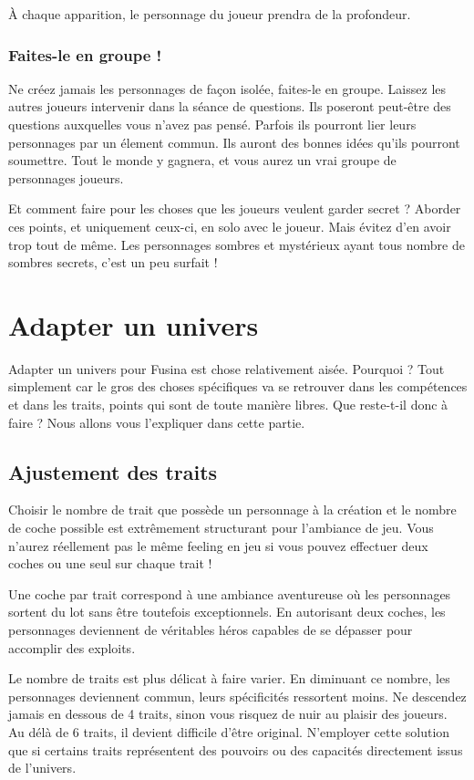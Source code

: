 \documentclass{conf/FusinaClass}
\begin{document}
À chaque apparition, le personnage du joueur prendra de la profondeur.

\section{Faites-le en groupe !}
Ne créez jamais les personnages de façon isolée, faites-le en groupe. Laissez les autres joueurs intervenir dans la séance de questions. Ils poseront peut-être des questions auxquelles vous n'avez pas pensé. Parfois ils pourront lier leurs personnages par un élement commun. Ils auront des bonnes idées qu'ils pourront soumettre. Tout le monde y gagnera, et vous aurez un vrai groupe de personnages joueurs.

Et comment faire pour les choses que les joueurs veulent garder secret ? Aborder ces points, et uniquement ceux-ci, en solo avec le joueur. Mais évitez d'en avoir trop tout de même. Les personnages sombres et mystérieux ayant tous nombre de sombres secrets, c'est un peu surfait !


\part{Adapter un univers}
Adapter un univers pour Fusina est chose relativement aisée. Pourquoi ? Tout simplement car le gros des choses spécifiques va se retrouver dans les compétences et dans les traits, points qui sont de toute manière libres. Que reste-t-il donc à faire ? Nous allons vous l'expliquer dans cette partie.

\chapter{Ajustement des traits}
Choisir le nombre de trait que possède un personnage à la création et le nombre de coche possible est extrêmement structurant pour l'ambiance de jeu. Vous n'aurez réellement pas le même feeling en jeu si vous pouvez effectuer deux coches ou une seul sur chaque trait !

Une coche par trait correspond à une ambiance aventureuse où les personnages sortent du lot sans être toutefois exceptionnels. En autorisant deux coches, les personnages deviennent de véritables héros capables de se dépasser pour accomplir des exploits. 

Le nombre de traits est plus délicat à faire varier. En diminuant ce nombre, les personnages deviennent commun, leurs spécificités ressortent moins. Ne descendez jamais en dessous de 4 traits, sinon vous risquez de nuir au plaisir des joueurs. Au délà de 6 traits, il devient difficile d'être original. N'employer cette solution que si certains traits représentent des pouvoirs ou des capacités directement issus de l'univers.
\end{document}
